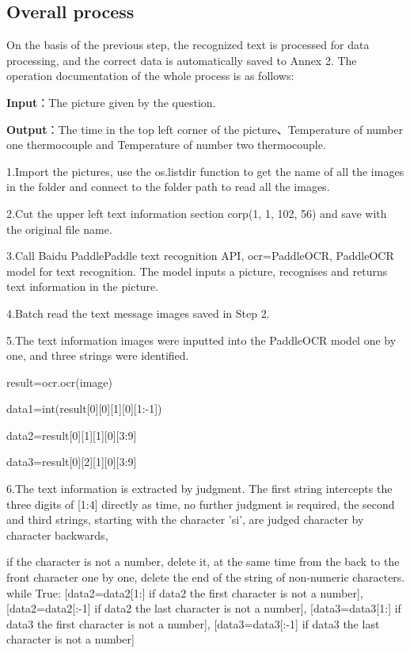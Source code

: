 \documentclass[12pt]{apmcmthesis}
\begin{document}
\subsection{Overall process}
On the basis of the previous step, the recognized text is processed for data processing, and the correct data is automatically saved to Annex 2. The operation documentation of the whole process is as follows:


\textbf{Input}：The picture given by the question. 

\textbf{Output}：The time in the top left corner of the picture、Temperature of number one thermocouple and Temperature of number two thermocouple. 

1.Import the pictures, use the os.listdir function to get the name of all the images in the folder and connect to the folder path to read all the images. 

2.Cut the upper left text information section corp(1, 1, 102, 56) and save with the original file name. 

3.Call Baidu PaddlePaddle text recognition API, ocr=PaddleOCR, PaddleOCR model for text recognition. The model inputs a picture, recognises and returns text information in the picture. 

4.Batch read the text message images saved in Step 2. 

5.The text information images were inputted into the PaddleOCR model one by one, and three strings were identified. 

result=ocr.ocr(image)

data1=int(result[0][0][1][0][1:-1])

data2=result[0][1][1][0][3:9]

data3=result[0][2][1][0][3:9]

6.The text information is extracted by judgment. The first string intercepts the three digits of [1:4] directly as time, no further judgment is required, the second and third strings, starting with the character 'si',  are judged character by character backwards,

if the character is not a number, delete it, at the same time from the back to the front character one by one, delete the end of the string of non-numeric characters. 
while True: [data2=data2[1:] if data2 the first character is not a number], [data2=data2[:-1] if data2 the last character is not a number],
[data3=data3[1:] if data3 the first character is not a number], [data3=data3[:-1] if data3 the last character is not a number]
\end{document}
